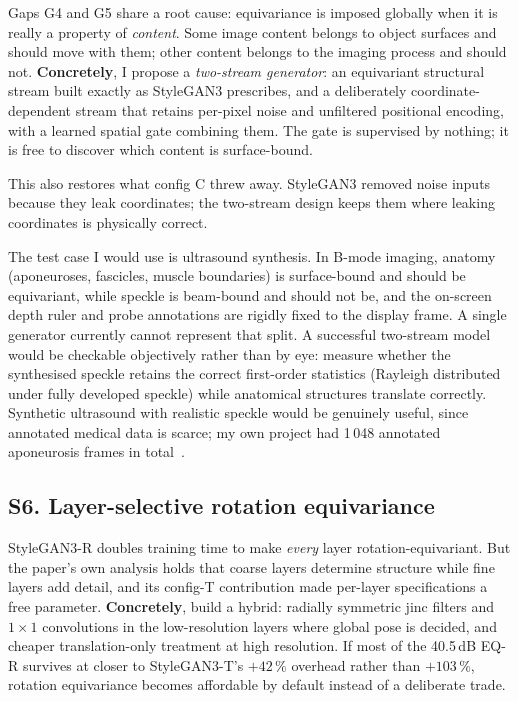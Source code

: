 \documentclass[11pt,a4paper]{article}
\begin{document}
Gaps G4 and G5 share a root cause: equivariance is imposed globally when it is
really a property of \emph{content}. Some image content belongs to object
surfaces and should move with them; other content belongs to the imaging process
and should not. \textbf{Concretely}, I propose a \emph{two-stream generator}: an
equivariant structural stream built exactly as StyleGAN3 prescribes, and a
deliberately coordinate-dependent stream that retains per-pixel noise and
unfiltered positional encoding, with a learned spatial gate combining them. The
gate is supervised by nothing; it is free to discover which content is
surface-bound.

This also restores what config C threw away. StyleGAN3 removed noise inputs
because they leak coordinates; the two-stream design keeps them where leaking
coordinates is physically correct.

The test case I would use is ultrasound synthesis. In B-mode imaging, anatomy
(aponeuroses, fascicles, muscle boundaries) is surface-bound and should be
equivariant, while speckle is beam-bound and should not be, and the on-screen
depth ruler and probe annotations are rigidly fixed to the display frame. A
single generator currently cannot represent that split. A successful two-stream
model would be checkable objectively rather than by eye: measure whether the
synthesised speckle retains the correct first-order statistics (Rayleigh
distributed under fully developed speckle) while anatomical structures translate
correctly. Synthetic ultrasound with realistic speckle would be genuinely useful,
since annotated medical data is scarce; my own project had 1\,048 annotated
aponeurosis frames in total~\citep{ritsche2024dltrack}.

\subsection*{S6. Layer-selective rotation equivariance}

StyleGAN3-R doubles training time to make \emph{every} layer rotation-equivariant.
But the paper's own analysis holds that coarse layers determine structure while
fine layers add detail, and its config-T contribution made per-layer
specifications a free parameter. \textbf{Concretely}, build a hybrid: radially
symmetric $\mathrm{jinc}$ filters and $1{\times}1$ convolutions in the
low-resolution layers where global pose is decided, and cheaper translation-only
treatment at high resolution. If most of the 40.5\,dB EQ-R survives at closer to
StyleGAN3-T's $+42\,\%$ overhead rather than $+103\,\%$, rotation equivariance
becomes affordable by default instead of a deliberate trade.
\end{document}
